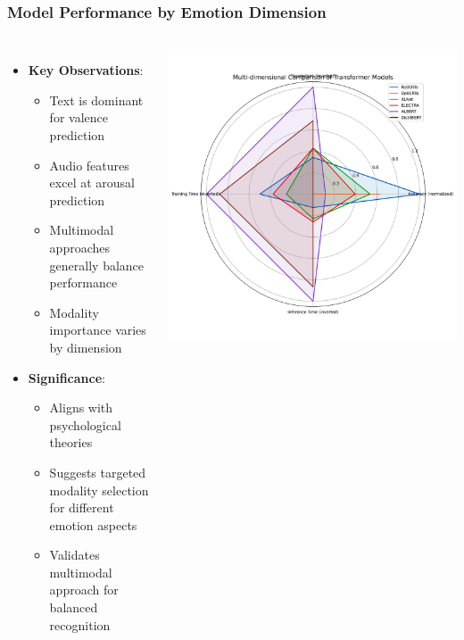 \begin{frame}
\frametitle{Model Performance by Emotion Dimension}
\begin{columns}
\begin{itemize}
    \item \textbf{Key Observations}:
    \begin{itemize}
        \item Text is dominant for valence prediction
        \item Audio features excel at arousal prediction
        \item Multimodal approaches generally balance performance
        \item Modality importance varies by dimension
    \end{itemize}
    \item \textbf{Significance}:
    \begin{itemize}
        \item Aligns with psychological theories
        \item Suggests targeted modality selection for different emotion aspects
        \item Validates multimodal approach for balanced recognition
    \end{itemize}
\end{itemize}

\includegraphics[width=\textwidth]{figures/radar_comparison.png}
\end{columns}
\end{frame}

